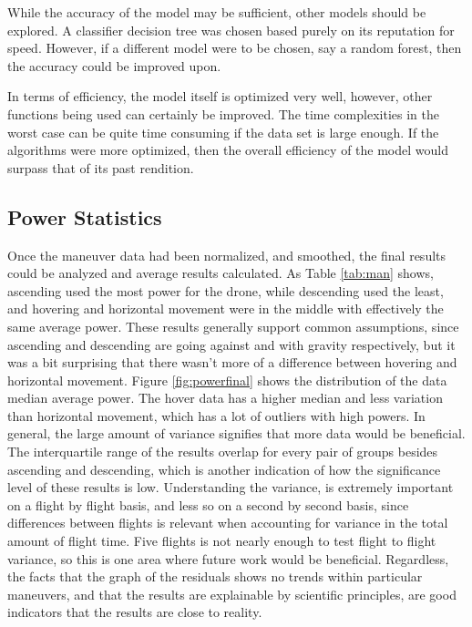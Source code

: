 \documentclass{article}
\begin{document}
While the accuracy of the model may be sufficient, other models should be explored. A classifier decision tree was chosen based purely on its reputation for speed. However, if a different model were to be chosen, say a random forest, then the accuracy could be improved upon.

In terms of efficiency, the model itself is optimized very well, however, other functions being used can certainly be improved. The time complexities in the worst case can be quite time consuming if the data set is large enough. If the algorithms were more optimized, then the overall efficiency of the model would surpass that of its past rendition.


\subsection{Power Statistics}

Once the maneuver data had been normalized, and smoothed, the final results could be analyzed and average results calculated. As Table \ref{tab:man} shows, ascending used the most power for the drone, while descending used the least, and hovering and horizontal movement were in the middle with effectively the same average power. These results generally support common assumptions, since ascending and descending are going against and with gravity respectively, but it was a bit surprising that there wasn't more of a difference between hovering and horizontal movement. Figure \ref{fig:powerfinal} shows the distribution of the data median average power. The hover data has a higher median and less variation than horizontal movement, which has a lot of outliers with high powers. In general, the large amount of variance signifies that more data would be beneficial. The interquartile range of the results overlap for every pair of groups besides ascending and descending, which is another indication of how the significance level of these results is low. Understanding the variance, is extremely important on a flight by flight basis, and less so on a second by second basis, since differences between flights is relevant when accounting for variance in the total amount of flight time. Five flights is not nearly enough to test flight to flight variance, so this is one area where future work would be beneficial. Regardless, the facts that the graph of the residuals shows no trends within particular maneuvers, and that the results are explainable by scientific principles, are good indicators that the results are close to reality. 
\end{document}
